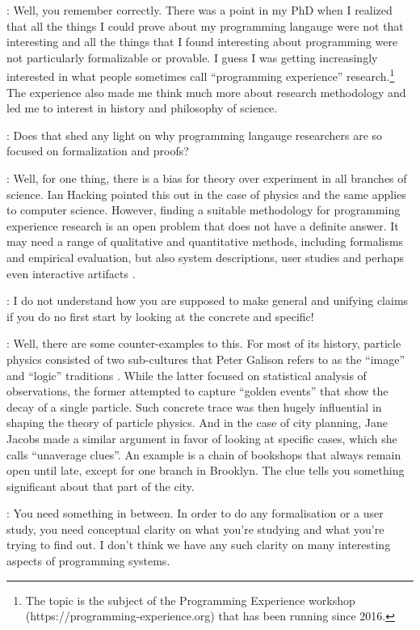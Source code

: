 \documentclass[runningheads]{llncs}
\newcommand{\T}{Tomas}
\newcommand{\J}{Joel}
\newcommand{\says}[2][gg]{\vspace{0.5em}\noindent\hangindent=0.5cm{\textsc{#1}}: #2}
\begin{document}
\says[\T]{Well, you remember correctly. There was a point in my PhD when I realized that all the things I could prove about my programming langauge were not that interesting and all the things that I found interesting about programming were not particularly formalizable or provable. I guess I was getting increasingly interested in what people sometimes call ``programming experience'' research.\footnote{The topic is the subject of the Programming Experience workshop\\ (https://programming-experience.org) that has been running since 2016.} The experience also made me think much more about research methodology and led me to interest in history and philosophy of science.}

\says[\J]{Does that shed any light on why programming langauge researchers are so focused on formalization and proofs?}

\says[\T]{Well, for one thing, there is a bias for theory over experiment in all branches of science. Ian Hacking \cite{hacking-1983-representing} pointed this out in the case of physics and the same applies to computer science. However, finding a suitable methodology for programming experience research is an open problem that does not have a definite answer. It may need a range of qualitative and quantitative methods, including formalisms and empirical evaluation, but also system descriptions, user studies and perhaps even interactive artifacts \cite{edwards-2019-eval}.}

\says[\J]{I do not understand how you are supposed to make general and unifying claims if you do no first start by looking at the concrete and specific!}

\says[\T]{Well, there are some counter-examples to this. For most of its history, particle physics consisted of two sub-cultures that Peter Galison refers to as the ``image'' and ``logic'' traditions \cite{galison-1997-image}. While the latter focused on statistical analysis of observations, the former attempted to capture ``golden events'' that show the decay of a single particle. Such concrete trace was then hugely influential in shaping the theory of particle physics. And in the case of city planning, Jane Jacobs made a similar argument \cite{jacobs-1961-death} in favor of looking at specific cases, which she calls ``unaverage clues''. An example is a chain of bookshops that always remain open until late, except for one branch in Brooklyn. The clue tells you something significant about that part of the city.}

\says[\J]{You need something in between. In order to do any formalisation or a user study, you need conceptual clarity on what you're studying and what you're trying to find out. I don't think we have any such clarity on many interesting aspects of programming systems.}
\end{document}
